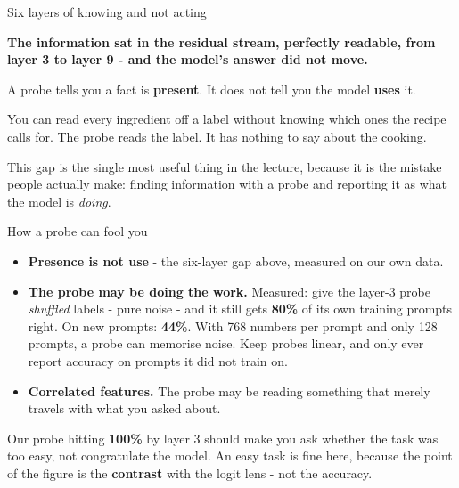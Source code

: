 \documentclass[aspectratio=169]{beamer}
\newcommand{\keybox}[1]{%
  \begin{tcolorbox}[colback=armblue!8, colframe=armblue, boxrule=0.6pt, arc=2pt]
  #1
  \end{tcolorbox}}
\newcommand{\trapbox}[1]{%
  \begin{tcolorbox}[colback=armred!8, colframe=armred, boxrule=0.6pt, arc=2pt]
  #1
  \end{tcolorbox}}
\newcommand{\watchbox}[1]{%
  \begin{tcolorbox}[colback=armorange!12, colframe=armorange, boxrule=0.6pt, arc=2pt]
  #1
  \end{tcolorbox}}
\begin{document}
\begin{frame}{Six layers of knowing and not acting}
  \vspace{1.0em}
  \trapbox{\textbf{The information sat in the residual stream, perfectly readable, from layer 3
  to layer 9 - and the model's answer did not move.}}

  \vspace{1.0em}
  \keybox{A probe tells you a fact is \textbf{present}. It does not tell you the model
  \textbf{uses} it.}

  \vspace{1.0em}
  You can read every ingredient off a label without knowing which ones the recipe calls for. The
  probe reads the label. It has nothing to say about the cooking.

  \vspace{0.9em}
  {\footnotesize This gap is the single most useful thing in the lecture, because it is the
  mistake people actually make: finding information with a probe and reporting it as what the
  model is \emph{doing}.}
\end{frame}

\begin{frame}{How a probe can fool you}
  \vspace{0.5em}
  \begin{itemize}
    \item \textbf{Presence is not use} - the six-layer gap above, measured on our own data.
    \item \textbf{The probe may be doing the work.} Measured: give the layer-3 probe
      \emph{shuffled} labels - pure noise - and it still gets \textbf{80\%} of its own training
      prompts right. On new prompts: \textbf{44\%}. With 768 numbers per prompt and only 128
      prompts, a probe can memorise noise. Keep probes linear, and only ever report accuracy on
      prompts it did not train on.
    \item \textbf{Correlated features.} The probe may be reading something that merely travels
      with what you asked about.
  \end{itemize}

  \vspace{0.8em}
  \watchbox{Our probe hitting \textbf{100\%} by layer 3 should make you ask whether the task was
  too easy, not congratulate the model. An easy task is fine here, because the point of the
  figure is the \textbf{contrast} with the logit lens - not the accuracy.}
\end{frame}
\end{document}
